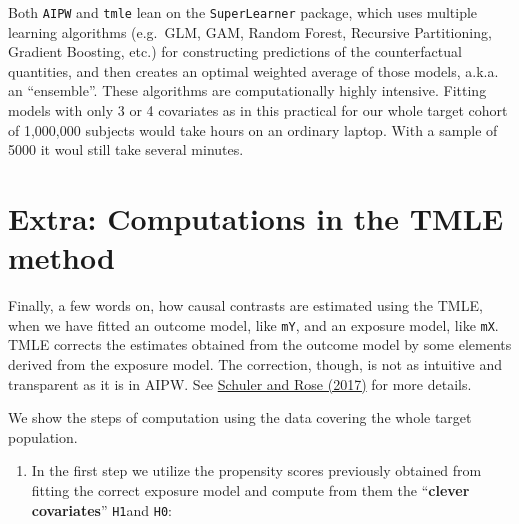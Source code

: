 \documentclass[
]{book}
\newenvironment{Shaded}{\begin{snugshade}}{\end{snugshade}}
\newcommand{\DecValTok}[1]{\textcolor[rgb]{0.00,0.00,0.81}{#1}}
\newcommand{\NormalTok}[1]{#1}
\newcommand{\OtherTok}[1]{\textcolor[rgb]{0.56,0.35,0.01}{#1}}
\newcommand{\SpecialCharTok}[1]{\textcolor[rgb]{0.81,0.36,0.00}{\textbf{#1}}}
\providecommand{\tightlist}{%
  \setlength{\itemsep}{0pt}\setlength{\parskip}{0pt}}
\begin{document}
Both \texttt{AIPW} and \texttt{tmle} lean on the \texttt{SuperLearner} package, which uses
multiple learning algorithms (e.g.~GLM, GAM, Random Forest, Recursive
Partitioning, Gradient Boosting, etc.) for constructing predictions of
the counterfactual quantities, and then creates an optimal weighted
average of those models, a.k.a. an ``ensemble''. These algorithms are
computationally highly intensive. Fitting models with only 3 or 4
covariates as in this practical for our whole target cohort of 1,000,000
subjects would take hours on an ordinary laptop. With a sample of 5000
it woul still take several minutes.

\section{Extra: Computations in the TMLE method}\label{extra-computations-in-the-tmle-method}

Finally, a few words on, how causal contrasts are estimated using the
TMLE, when we have fitted an outcome model, like \texttt{mY}, and an exposure
model, like \texttt{mX}. TMLE corrects the estimates obtained from the outcome
model by some elements derived from the exposure model. The correction,
though, is not as intuitive and transparent as it is in AIPW. See
\href{https://doi.org/10.1093/aje/kww165}{Schuler and Rose (2017)} for more
details.

We show the steps of computation using the data covering the whole
target population.

\begin{enumerate}
\def\labelenumi{\arabic{enumi}.}
\tightlist
\item
  In the first step we utilize the propensity scores previously
  obtained from fitting the correct exposure model and compute from
  them the ``\textbf{clever covariates}'' \texttt{H1}and \texttt{H0}:
\end{enumerate}

\begin{Shaded}
\end{Shaded}
\end{document}
